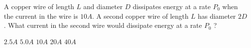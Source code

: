 \begin{questions}\setcounter{question}{5}\question
A copper wire of length $L$ and diameter $D$ dissipates energy at a rate $P_{0}$ when the current in the wire is $10 \unit{A}$. A second copper wire of length $L$ has diameter $2 D$. What current in the second wire would dissipate energy at a rate $P_{0}$ ?

\begin{oneparchoices}
\choice $2.5 \unit{A}$
\choice $5.0 \unit{A}$
\choice $10  \unit{A}$
\choice $20  \unit{A}$
\choice $40  \unit{A}$
\end{oneparchoices}\end{questions}
